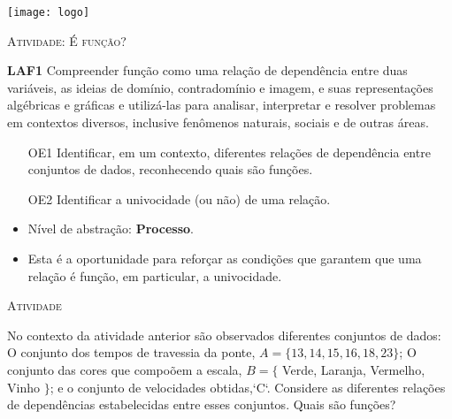 \documentclass[10 pt,usenames,dvipsnames, oneside]{article}
\begin{document}
\begin{center}
  \begin{minipage}[l]{3cm}
\texttt{[image: logo]}    
\end{minipage}\hfill
\begin{minipage}[r]{.8\textwidth}
 {\Large \scshape Atividade: É função?}  
\end{minipage}
\end{center}
\vspace{.2cm}

\ifdefined\prof
\begin{objetivos}
\item \textbf{LAF1} Compreender função como uma relação de dependência entre duas variáveis, as ideias de domínio, contradomínio e imagem, e suas representações algébricas e gráficas e utilizá-las para analisar, interpretar e resolver problemas em contextos diversos, inclusive fenômenos naturais, sociais e de outras áreas.
\end{objetivos}

\begin{goals}
\begin{enumerate}

\item[OE1] Identificar, em um contexto, diferentes relações de dependência entre conjuntos de dados, reconhecendo quais são funções.

\item[OE2] Identificar a univocidade (ou não) de uma relação.

\end{enumerate}

\tcblower

\begin{itemize}
\item Nível de abstração: \textbf{Processo}.

\item Esta é a oportunidade para reforçar as condições que garantem que uma relação é função, em particular, a univocidade.
\end{itemize}

\end{goals}

\bigskip
\begin{center}
{\large \scshape Atividade}
\end{center}
\fi

No contexto da atividade anterior são observados diferentes conjuntos de dados: O conjunto dos tempos de travessia da ponte, \(A=\{13, 14, 15, 16, 18, 23\}\); O conjunto das cores que compoõem a escala, \(B=\{\) Verde, Laranja, Vermelho, Vinho \(\}\); e o conjunto de velocidades obtidas,{}`C{}`. Considere as diferentes relações de dependências estabelecidas entre esses conjuntos. Quais são funções?
\end{document}
